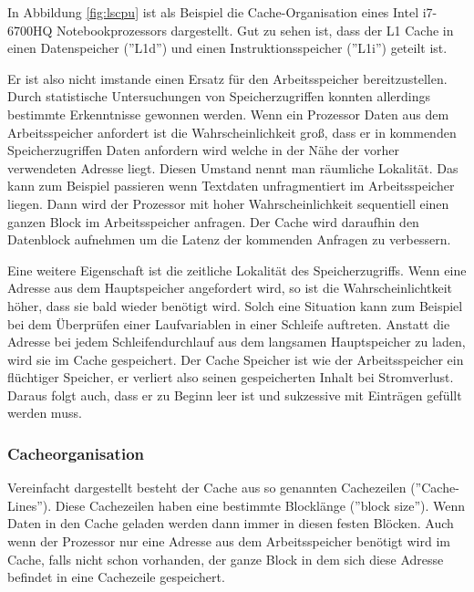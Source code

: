 \documentclass[12pt]{article}
\begin{document}
\noindent In Abbildung \ref{fig:lscpu} ist als Beispiel die Cache-Organisation eines Intel i7-6700HQ Notebookprozessors dargestellt. Gut zu sehen ist, dass der L1 Cache in einen Datenspeicher (''L1d'') und einen Instruktionsspeicher (''L1i'') geteilt ist. 

\noindent Er ist also nicht imstande einen Ersatz für den Arbeitsspeicher bereitzustellen. Durch statistische Untersuchungen von Speicherzugriffen konnten allerdings bestimmte Erkenntnisse gewonnen werden. Wenn ein Prozessor Daten aus dem Arbeitsspeicher anfordert ist die Wahrscheinlichkeit groß, dass er in kommenden Speicherzugriffen Daten anfordern wird welche in der Nähe der vorher verwendeten Adresse liegt. Diesen Umstand nennt man räumliche Lokalität. Das kann zum Beispiel passieren wenn Textdaten unfragmentiert im Arbeitsspeicher liegen. Dann wird der Prozessor mit hoher Wahrscheinlichkeit sequentiell einen ganzen Block im Arbeitsspeicher anfragen. Der Cache wird daraufhin den Datenblock aufnehmen um die Latenz der kommenden Anfragen zu verbessern. 

\noindent Eine weitere Eigenschaft ist die zeitliche Lokalität des Speicherzugriffs. Wenn eine Adresse aus dem Hauptspeicher angefordert wird, so ist die Wahrscheinlichtkeit höher, dass sie bald wieder benötigt wird. Solch eine Situation kann zum Beispiel bei dem Überprüfen einer Laufvariablen in einer Schleife auftreten. Anstatt die Adresse bei jedem Schleifendurchlauf aus dem langsamen Hauptspeicher zu laden, wird sie im Cache gespeichert. 
Der Cache Speicher ist wie der Arbeitsspeicher ein flüchtiger Speicher, er verliert also seinen gespeicherten Inhalt bei Stromverlust. Daraus folgt auch, dass er zu Beginn leer ist und sukzessive mit Einträgen gefüllt werden muss.\cite[S.180-188]{mikroprozessortechnik2011}
\subsubsection{Cacheorganisation}
Vereinfacht dargestellt besteht der Cache aus so genannten Cachezeilen (''Cache-Lines''). Diese Cachezeilen haben eine bestimmte Blocklänge (''block size'')\cite[S.183]{mikroprozessortechnik2011}. Wenn Daten in den Cache geladen werden dann immer in diesen festen Blöcken. Auch wenn der Prozessor nur eine Adresse aus dem Arbeitsspeicher benötigt wird im Cache, falls nicht schon vorhanden, der ganze Block in dem sich diese Adresse befindet in eine Cachezeile gespeichert.
\end{document}
